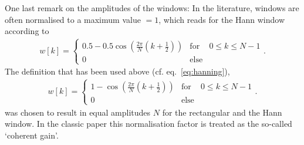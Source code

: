 \documentclass[11pt,a4paper,DIV=12]{scrartcl}
\begin{document}
One last remark on the amplitudes of the windows: In the literature, windows
are often normalised to a maximum value $=1$, which reads for
the Hann window according to \cite{Moeser2011}
%
\begin{align}
w[k]=\left\{\begin{matrix}0.5-0.5\cos\left(\frac{2\pi}{N}\left(k+\frac{1}{2}\right)\right) & \text{for} & 0\leq k\leq N-1\\0 & \text{else} &\end{matrix}\right..
\end{align}
%
The definition that has been used above (cf. eq.~\eqref{eq:hanning}),
\begin{align}
w[k]=\left\{\begin{matrix}1-\cos\left(\frac{2\pi}{N}\left(k+\frac{1}{2}\right)\right) & \text{for} & 0\leq k\leq N-1\\0 & \text{else} &\end{matrix}\right..
\end{align}
was chosen to result in equal amplitudes $N$ for the rectangular and the Hann
window.
%
In the classic paper \cite[tab.~1]{Harris1978} this normalisation
factor is treated as the so-called `coherent gain'.

\end{document}
